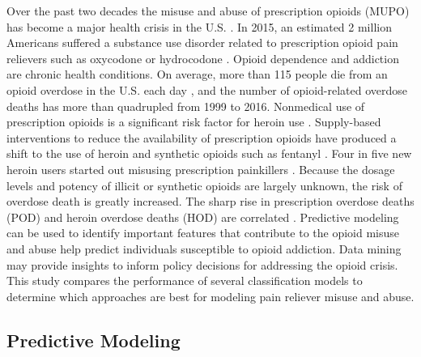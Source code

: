 \documentclass[sigconf]{acmart}
\begin{document}
Over the past two decades the misuse and abuse of prescription opioids 
(MUPO) has become a major health crisis in the U.S. \cite{volkow14}. In 2015, 
an estimated 2 million Americans suffered a substance use disorder related 
to prescription opioid pain relievers such as oxycodone or hydrocodone 
\cite{nida18}. Opioid dependence and addiction are chronic health conditions. 
On average, more than 115 people die from an opioid overdose in the U.S. 
each day \cite{cdc18}, and the number of opioid-related overdose deaths has 
more than quadrupled from 1999 to 2016. Nonmedical use of prescription opioids 
is a significant risk factor for heroin use \cite{Rudd16}. Supply-based 
interventions to reduce the availability of prescription opioids have produced 
a shift to the use of heroin and synthetic opioids such as fentanyl 
\cite{jones15}. Four in five new heroin users started out misusing prescription 
painkillers \cite{jones13}. Because the dosage levels and potency of illicit 
or synthetic opioids are largely unknown, the risk of overdose death is greatly 
increased. The sharp rise in prescription overdose deaths (POD) and heroin 
overdose deaths (HOD) are correlated \cite{muhuri13, unick13}. Predictive 
modeling can be used to identify important features that contribute to the 
opioid misuse and abuse help predict individuals susceptible to opioid 
addiction. Data mining may provide insights to inform policy decisions for 
addressing the opioid crisis. This study compares the performance of several 
classification models to determine which approaches are best for
modeling pain reliever misuse and abuse. 


\subsection{Predictive Modeling}
\end{document}
